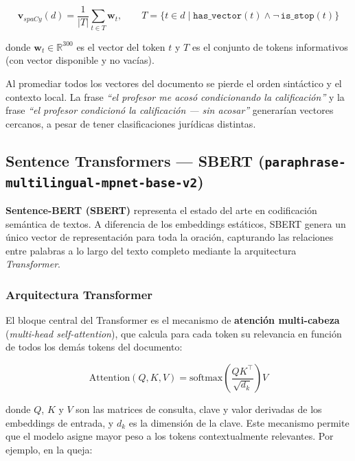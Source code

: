 \begin{equation}
  \mathbf{v}_{spaCy}(d)
  = \frac{1}{|T|} \sum_{t \in T} \mathbf{w}_t, \qquad
  T = \bigl\{t \in d \;\big|\; \texttt{has\_vector}(t)
      \wedge \neg\,\texttt{is\_stop}(t)\bigr\}
  \label{eq:spacy}
\end{equation}

donde $\mathbf{w}_t \in \mathbb{R}^{300}$ es el vector del token $t$ y $T$ es
el conjunto de tokens informativos (con vector disponible y no vacías).

Al promediar todos los vectores del
documento se pierde el orden sintáctico y el contexto local. La frase
\textit{``el profesor me acosó condicionando la calificación''} y la frase
\textit{``el profesor condicionó la calificación — sin acosar''} generarían
vectores cercanos, a pesar de tener clasificaciones jurídicas distintas.

\subsection{Sentence Transformers — SBERT
            (\texttt{paraphrase-multilingual-mpnet-base-v2})}

\textbf{Sentence-BERT (SBERT)}   representa el estado del arte en codificación
semántica de textos. \cite{reimers2019}A diferencia de los embeddings estáticos, SBERT genera un
único vector de representación para toda la oración, capturando las relaciones
entre palabras a lo largo del texto completo mediante la arquitectura
\textit{Transformer}.

\subsubsection*{Arquitectura Transformer}

El bloque central del Transformer es el mecanismo de \textbf{atención
multi-cabeza} (\textit{multi-head self-attention}), que calcula para cada token
su relevancia en función de todos los demás tokens del documento:

\begin{equation}
  \text{Attention}(Q, K, V)
  = \text{softmax}\!\left(\frac{QK^\top}{\sqrt{d_k}}\right) V
  \label{eq:attention}
\end{equation}

donde $Q$, $K$ y $V$ son las matrices de consulta, clave y valor derivadas
de los embeddings de entrada, y $d_k$ es la dimensión de la clave.  \cite{vaswani2017} Este
mecanismo permite que el modelo asigne mayor peso a los tokens contextualmente
relevantes. Por ejemplo, en la queja:

